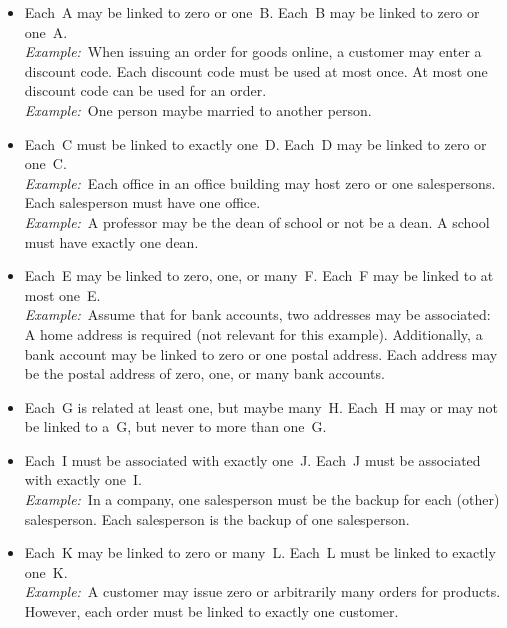 \begin{itemize}%
%
\item {} Each~A may be linked to zero or one~B. Each~B may be linked to zero or one~A.~\cite{BS2023G:CFNIERD}\\%
\emph{Example:}~When issuing an order for goods online, a customer may enter a discount code.
Each discount code must be used at most once.
At most one discount code can be used for an order.~\cite{BS2023G:CFNIERD}\\%
\emph{Example:}~One person maybe married to another person.~\cite{R2024CDS:E}%
%
\item {} Each~C must be linked to exactly one~D. Each~D may be linked to zero or one~C.~\cite{T2025CDBMS:ERM}\\%
\emph{Example:}~Each office in an office building may host zero or one salespersons.
Each salesperson must have one office.~\cite{T2025CDBMS:ERM}\\%
\emph{Example:}~A professor may be the dean of school or not be a dean.
A school must have exactly one dean.~\cite{R2024CDS:E}%
%
\item {} Each~E may be linked to zero, one, or many~F. Each~F may be linked to at most one~E.~\cite{MA2006MAC:DMERDED}\\%
\emph{Example:}~Assume that for bank accounts, two addresses may be associated:
A home address is required (not relevant for this example).
Additionally, a bank account may be linked to zero or one postal address.
Each address may be the postal address of zero, one, or many bank accounts.~\cite{MA2006MAC:DMERDED}%
%
\item {} Each~G is related at least one, but maybe many~H. Each~H may or may not be linked to a~G, but never to more than one~G.%
%
\item {} Each~I must be associated with exactly one~J. Each~J must be associated with exactly one~I.\\%
\emph{Example:}~In a company, one salesperson must be the backup for each (other) salesperson.
Each salesperson is the backup of one salesperson.~\cite{T2025CDBMS:ERM}%
%
\item {} Each~K may be linked to zero or many~L. Each~L must be linked to exactly one~K.~\cite{MA2006MAC:DMERDED,BS2023G:CFNIERD}\\%
\emph{Example:}~A customer may issue zero or arbitrarily many orders for products.
However, each order must be linked to exactly one customer.~\cite{BS2023G:CFNIERD}\\%

\end{itemize}
